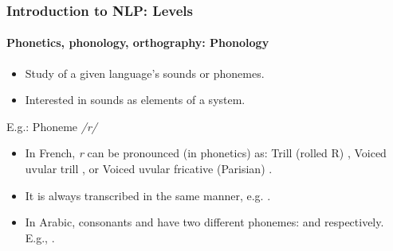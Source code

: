 \documentclass[xcolor=table]{beamer}
\begin{document}
\begin{frame}
\frametitle{Introduction to NLP: Levels}
\framesubtitle{Phonetics, phonology, orthography: Phonology}


\begin{itemize}
	\item Study of a given language's sounds or phonemes.
	\item Interested in sounds as elements of a system.
\end{itemize}

\begin{exampleblock}{E.g.: Phoneme \textit{/r/}}
	\begin{itemize}
		\item In French, \textit{r} can be pronounced (in phonetics) as: Trill (rolled R) \expword{\textipa{[r]}}, Voiced uvular trill \expword{\textipa{[\;R]}}, or Voiced uvular fricative (Parisian) \expword{\textipa{[K]}}.
		\item It is always transcribed in the same manner, e.g. .
		\item In Arabic, consonants  and  have two different phonemes:  and  respectively. 
		E.g., .
	\end{itemize}
\end{exampleblock}

\end{frame}
\end{document}
